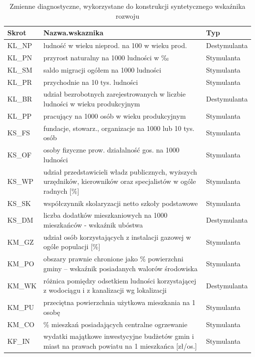 \documentclass{amuthesis}
\begin{document}
\begin{table}

\caption{\label{tab:tabela1}Zmienne diagnostyczne, wykorzystane do konstrukcji syntetycznego wskaźnika rozwoju}
\centering
\begin{tabular}[t]{>{\raggedright\arraybackslash}p{2cm}>{\raggedright\arraybackslash}p{11cm}l}
\toprule
Skrot & Nazwa.wskaznika & Typ\\
\midrule
KL\_NP & ludność w wieku nieprod. na 100 w wieku prod. & Destymulanta\\
KL\_PN & przyrost naturalny na 1000 ludności w ‰ & Stymulanta\\
KL\_SM & saldo migracji ogółem na 1000 ludności & Stymulanta\\
KL\_PR & przychodnie na 10 tys. ludności & Stymulanta\\
KL\_BR & udział bezrobotnych zarejestrowanych w liczbie ludności w wieku produkcyjnym & Destymulanta\\
\addlinespace
KL\_PP & pracujący na 1000 osób w wieku produkcyjnym & Stymulanta\\
KS\_FS & fundacje, stowarz., organizacje na 1000 lub 10 tys. osób & Stymulanta\\
KS\_OF & osoby fizyczne prow. działalność gos. na 1000 ludności & Stymulanta\\
KS\_WP & udział przedstawicieli władz publicznych, wyższych urzędników, kierowników oraz specjalistów w ogóle radnych  [\%] & Stymulanta\\
KS\_SK & współczynnik skolaryzacji netto szkoły podstawowe & Stymulanta\\
\addlinespace
KS\_DM & liczba dodatków mieszkaniowych na 1000 mieszkańców - wskaźnik ubóstwa & Destymulanta\\
KM\_GZ & udział osób korzystających z instalacji gazowej w ogóle populacji [\%] & Stymulanta\\
KM\_PO & obszary prawnie chronione jako \% powierzchni gminy – wskaźnik posiadanych walorów środowiska & Stymulanta\\
KM\_WK & różnica pomiędzy odsetkiem ludności korzystającej z wodociągu i z kanalizacji wg lokalizacji & Destymulanta\\
KM\_PU & przeciętna powierzchnia użytkowa mieszkania na 1 osobę & Stymulanta\\
\addlinespace
KM\_CO & \% mieszkań posiadających centralne ogrzewanie & Stymulanta\\
KF\_IN & wydatki majątkowe inwestycyjne budżetów gmin i miast na prawach powiatu na 1 mieszkańca [zł/os.] & Stymulanta\\

\end{tabular}
\end{table}
\end{document}
